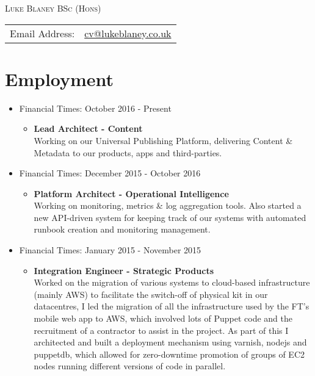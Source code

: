 \documentclass[a4paper]{article}
\begin{document}
\begin{center}\textsc{\LARGE Luke Blaney BSc (Hons)}\end{center}

\begin{tabular}{ l l }

Email Address: & \href{mailto:cv@lukeblaney.co.uk}{cv@lukeblaney.co.uk}\\

\end{tabular}

\section*{Employment}


\begin{itemize}

\item Financial Times: October 2016 - Present
\begin{itemize}\item
 {\bf Lead Architect - Content}\\
Working on our Universal Publishing Platform, delivering Content \& Metadata to our products, apps and third-parties.
\end{itemize}

\item Financial Times: December 2015 - October 2016
\begin{itemize}\item
 {\bf Platform Architect - Operational Intelligence}\\
 Working on monitoring, metrics \& log aggregation tools. Also started a new API-driven system for keeping track of our systems with automated runbook creation and monitoring management.
\end{itemize}

\item Financial Times: January 2015 - November 2015
\begin{itemize}

\item {\bf Integration Engineer - Strategic Products} \\
Worked on the migration of various systems to cloud-based infrastructure (mainly AWS) to facilitate the switch-off of physical kit in our datacentres, I led the migration of all the infrastructure used by the FT's mobile web app to AWS, which involved lots of Puppet code and the recruitment of a contractor to assist in the project. As part of this I architected and built a deployment mechanism using varnish, nodejs and puppetdb, which allowed for zero-downtime promotion of groups of EC2 nodes running different versions of code in parallel. 


\end{itemize}
\end{itemize}
\end{document}
